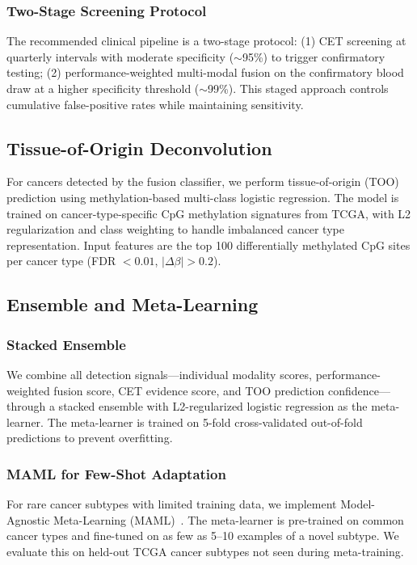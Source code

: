 \documentclass[10pt,a4paper]{article}
\begin{document}
\subsubsection{Two-Stage Screening Protocol}

The recommended clinical pipeline is a two-stage protocol: (1) CET screening at quarterly intervals with moderate specificity ($\sim$95\%) to trigger confirmatory testing; (2) performance-weighted multi-modal fusion on the confirmatory blood draw at a higher specificity threshold ($\sim$99\%). This staged approach controls cumulative false-positive rates while maintaining sensitivity.

\subsection{Tissue-of-Origin Deconvolution}

For cancers detected by the fusion classifier, we perform tissue-of-origin (TOO) prediction using methylation-based multi-class logistic regression. The model is trained on cancer-type-specific CpG methylation signatures from TCGA, with L2 regularization and class weighting to handle imbalanced cancer type representation. Input features are the top 100 differentially methylated CpG sites per cancer type (FDR $< 0.01$, $|\Delta\beta| > 0.2$).

\subsection{Ensemble and Meta-Learning}

\subsubsection{Stacked Ensemble}

We combine all detection signals—individual modality scores, performance-weighted fusion score, CET evidence score, and TOO prediction confidence—through a stacked ensemble with L2-regularized logistic regression as the meta-learner. The meta-learner is trained on 5-fold cross-validated out-of-fold predictions to prevent overfitting.

\subsubsection{MAML for Few-Shot Adaptation}

For rare cancer subtypes with limited training data, we implement Model-Agnostic Meta-Learning (MAML)~\cite{finn2017model}. The meta-learner is pre-trained on common cancer types and fine-tuned on as few as 5--10 examples of a novel subtype. We evaluate this on held-out TCGA cancer subtypes not seen during meta-training.
\end{document}
